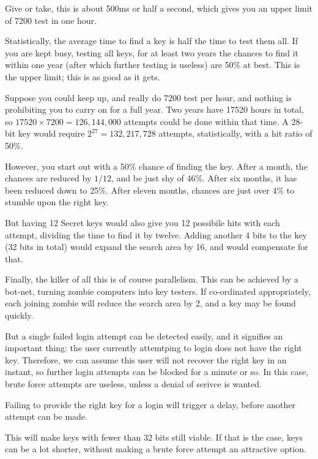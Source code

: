 Give or take, this is about 500ms or half a second,
which gives you an upper limit of 7200 test in one hour.
\par
Statistically, the average time to find a key is half the time to test them all.
If you are kept busy, testing all keys, for at least two years the chances to find it within one year
(after which further testing is useless)
are 50\% at best.
This is the upper limit; this is as good as it gets.
\par
Suppose you could keep up, and really do 7200 test per hour, and nothing is prohibiting you to carry on for a full year.
Two years have 17520 hours in total,
so $17520\times 7200=126,144,000$ attempts could be done within that time.
A 28-bit key would require $2^{27}=132,217,728$ attempts, statistically, with a hit ratio of 50\%.
\par
However, you start out with a 50\% chance of finding the key.
After a month, the chances are reduced by $1/12$, and be just shy of 46\%.
After six months, it has been reduced down to 25\%.
After eleven months, chances are just over 4\% to stumble upon the right key.
\par
But having 12 Secret keys would also give you 12 possibile hits with each attempt,
dividing the time to find it by twelve.
Adding another 4 bits to the key
(32 bits in total)
would expand the search area by 16, and would compensate for that.
\par
Finally, the killer of all this is of course parallelism.
This can be achieved by a bot-net, turning zombie computers into key testers.
If co-ordinated appropriately, each joining zombie will reduce the search area by 2, and a key may be found quickly.
\par
But a single failed login attempt can be detected easily, and it signifies an important thing:
the user currently attemtping to login does not have the right key.
Therefore, we can assume this user will not recover the right key in an instant,
so further login attempts can be blocked for a minute or so.
In this case, brute force attempts are useless, unless a denial of serivce is wanted.
\begin{moafu}
Failing to provide the right key for a login will trigger a delay,
before another attempt can be made.
\end{moafu}
This will make keys with fewer than 32 bits still viable.
If that is the case,
keys can be a lot shorter,
without making a brute force attempt an attractive option.

